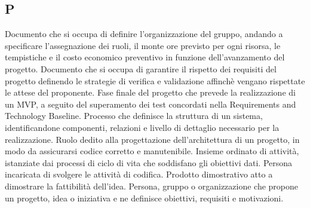 \begin{center}
\section*{P}
\end{center}
Documento che si occupa di definire l'organizzazione del gruppo, andando a specificare l'assegnazione dei ruoli, il monte ore previsto per ogni risorsa, le tempistiche e il costo economico preventivo in funzione dell'avanzamento del progetto.
Documento che si occupa di garantire il rispetto dei requisiti del progetto definendo le strategie di verifica e validazione affinchè vengano rispettate le attese del proponente.
Fase finale del progetto che prevede la realizzazione di un MVP, a seguito del superamento dei test concordati nella Requirements and Technology Baseline.
Processo che definisce la struttura di un sistema, identificandone componenti, relazioni e livello di dettaglio necessario per la realizzazione.
Ruolo dedito alla progettazione dell'architettura di un progetto, in modo da assicurarsi codice corretto e manutenibile.
Insieme ordinato di attività, istanziate dai processi di ciclo di vita che soddisfano gli obiettivi dati.
Persona incaricata di svolgere le attività di codifica.
Prodotto dimostrativo atto a dimostrare la fattibilità dell'idea.
Persona, gruppo o organizzazione che propone un progetto, idea o iniziativa e ne definisce obiettivi, requisiti e motivazioni.
